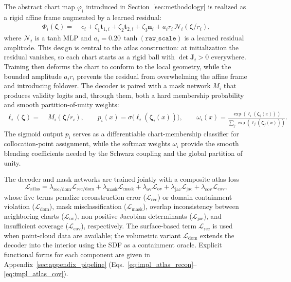 \documentclass[sort&compress]{svjour3} %
\begin{document}
The abstract chart map $\varphi_i$ introduced in Section~\ref{sec:methodology} is realized as a rigid affine frame augmented by a learned residual:
\begin{align}
\Phi_i(\boldsymbol{\zeta})
=&\;
c_i
+
\zeta_1 \mathbf{t}_{1,i}
+
\zeta_2 \mathbf{t}_{2,i}
+
\zeta_3 \mathbf{n}_i
+
a_i r_i\,\mathcal{N}_i(\boldsymbol{\zeta}/r_i),
\label{eq:impl_decoder_map}
\end{align}
where $\mathcal{N}_i$ is a tanh MLP and $a_i=0.20\,\tanh(\texttt{raw\_scale})$ is a learned residual amplitude. This design is central to the atlas construction: at initialization the residual vanishes, so each chart starts as a rigid ball with $\det\mathbf{J}_i>0$ everywhere. Training then deforms the chart to conform to the local geometry, while the bounded amplitude $a_i r_i$ prevents the residual from overwhelming the affine frame and introducing foldover. The decoder is paired with a mask network $M_i$ that produces validity logits and, through them, both a hard membership probability and smooth partition-of-unity weights:
\begin{align}
\ell_i(\boldsymbol{\zeta})
=&\;
M_i(\boldsymbol{\zeta}/r_i),
\qquad
p_i(x)=\sigma\!\big(\ell_i(\boldsymbol{\zeta}_i(x))\big),
\qquad
\omega_i(x)=\frac{\exp(\ell_i(\boldsymbol{\zeta}_i(x)))}{\sum_j \exp(\ell_j(\boldsymbol{\zeta}_j(x)))}.
\label{eq:impl_mask_weights}
\end{align}
The sigmoid output $p_i$ serves as a differentiable chart-membership classifier for collocation-point assignment, while the softmax weights $\omega_i$ provide the smooth blending coefficients needed by the Schwarz coupling and the global partition of unity.

The decoder and mask networks are trained jointly with a composite atlas loss
\begin{equation}
\mathcal{L}_{\mathrm{atlas}}
=
\lambda_{\mathrm{rec/dom}}\mathcal{L}_{\mathrm{rec/dom}}
+
\lambda_{\mathrm{mask}}\mathcal{L}_{\mathrm{mask}}
+
\lambda_{\mathrm{ov}}\mathcal{L}_{\mathrm{ov}}
+
\lambda_{\mathrm{jac}}\mathcal{L}_{\mathrm{jac}}
+
\lambda_{\mathrm{cov}}\mathcal{L}_{\mathrm{cov}},
\label{eq:impl_atlas_total}
\end{equation}
whose five terms penalize reconstruction error ($\mathcal{L}_{\mathrm{rec}}$) or domain-containment violation ($\mathcal{L}_{\mathrm{dom}}$), mask misclassification ($\mathcal{L}_{\mathrm{mask}}$), overlap inconsistency between neighboring charts ($\mathcal{L}_{\mathrm{ov}}$), non-positive Jacobian determinants ($\mathcal{L}_{\mathrm{jac}}$), and insufficient coverage ($\mathcal{L}_{\mathrm{cov}}$), respectively. The surface-based term $\mathcal{L}_{\mathrm{rec}}$ is used when point-cloud data are available; the volumetric variant $\mathcal{L}_{\mathrm{dom}}$ extends the decoder into the interior using the SDF as a containment oracle. Explicit functional forms for each component are given in Appendix~\ref{sec:appendix_pipeline} (Eqs.~\eqref{eq:impl_atlas_recon}--\eqref{eq:impl_atlas_cov}).
\end{document}

